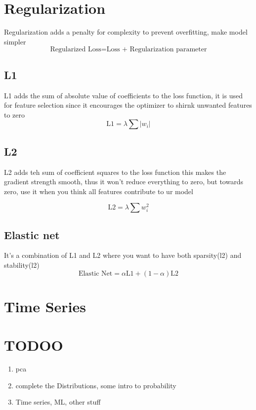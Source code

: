 \documentclass[12pt]{extarticle}
\begin{document}
\section{Regularization}
Regularization adds a penalty for complexity to prevent overfitting, make model simpler
$$\text{Regularized Loss} = \text{Loss + Regularization parameter}$$

\subsection{L1}
L1 adds the sum of absolute value of coefficients to the loss function, 
it is used for feature selection since it encourages the optimizer to shirnk
unwanted features to zero
$$\text{L1} = \lambda \sum|w_i| $$

\subsection{L2}
L2 adds teh sum of coefficient squares to the loss function this 
makes the gradient strength smooth, thus it won't reduce everything 
to zero, but towards zero, use it when you think all features contribute
to ur model

$$ \text{L2} = \lambda \sum w_i^2 $$

\subsection{Elastic net}
It's a combination of L1 and L2 where you want to have both sparsity(l2) 
and stability(l2)
$$ \text{Elastic Net} = \alpha \text{L1} + (1-\alpha)\text{L2} $$







\section{Time Series}


\section{TODOO}
\begin{enumerate}
    \item pca
    \item complete the Distributions, some intro to probability
    \item Time series, ML, other stuff

\end{enumerate}
\end{document}
